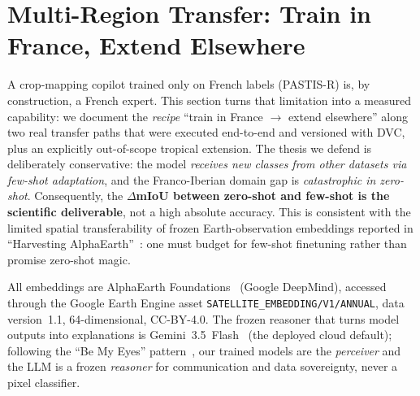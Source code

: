 
\section{Multi-Region Transfer: Train in France, Extend Elsewhere}
\label{sec:multiregion}

A crop-mapping copilot trained only on French labels (PASTIS-R) is, by construction,
a French expert. This section turns that limitation into a measured capability: we
document the \emph{recipe} ``train in France $\rightarrow$ extend elsewhere'' along two
real transfer paths that were executed end-to-end and versioned with DVC, plus an
explicitly out-of-scope tropical
extension. The thesis we defend is deliberately conservative: the model \emph{receives
new classes from other datasets via few-shot adaptation}, and the Franco-Iberian domain
gap is \emph{catastrophic in zero-shot}. Consequently, the \textbf{$\Delta$mIoU between
zero-shot and few-shot is the scientific deliverable}, not a high absolute accuracy. This
is consistent with the limited spatial transferability of frozen Earth-observation
embeddings reported in ``Harvesting AlphaEarth''~\cite{harvesting2026alphaearth}: one must
budget for few-shot finetuning rather than promise zero-shot magic.

All embeddings are AlphaEarth Foundations~\cite{brown2025alphaearth} (Google DeepMind),
accessed through the Google Earth Engine asset \texttt{SATELLITE\_EMBEDDING/V1/ANNUAL},
data version~1.1, 64-dimensional, CC-BY-4.0. The frozen reasoner that turns model outputs
into explanations is Gemini~3.5~Flash~\cite{google2025gemini25} (the deployed cloud default);
following the ``Be My Eyes'' pattern~\cite{huang2025bemyeyes}, our trained models are the
\emph{perceiver} and the LLM is a frozen \emph{reasoner} for communication and data
sovereignty, never a pixel classifier.

